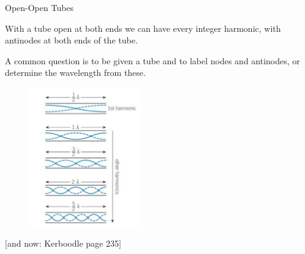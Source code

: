 \documentclass[../Main.tex]{subfiles}
\begin{document}
\begin{frame}{Open-Open Tubes}
    \begin{multicols}{2}
    With a tube open at both ends we can have every integer harmonic, with antinodes at both ends of the tube. 
    \newline
    
    A common question is to be given a tube and to label nodes and antinodes, or determine the wavelength from these.
    \columnbreak
    \begin{figure}
        \centering
        \includegraphics[height=6cm]{Waves_Images/open-open_harmonics.jpg}
    \end{figure}
    \end{multicols}
    \pause 
    $[$and now: Kerboodle page 235$]$
\end{frame}
\end{document}
